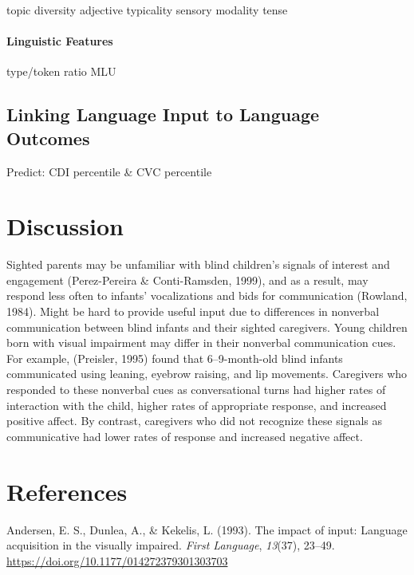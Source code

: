 \documentclass[english,man]{apa6}
\begin{document}
topic diversity
adjective typicality
sensory modality
tense

\hypertarget{linguistic-features}{%
\paragraph{Linguistic Features}\label{linguistic-features}}

type/token ratio
MLU

\hypertarget{linking-language-input-to-language-outcomes}{%
\subsection{Linking Language Input to Language Outcomes}\label{linking-language-input-to-language-outcomes}}

Predict: CDI percentile \& CVC percentile

\hypertarget{discussion}{%
\section{Discussion}\label{discussion}}

Sighted parents may be unfamiliar with blind children's signals of interest and engagement (Perez-Pereira \& Conti-Ramsden, 1999), and as a result, may respond less often to infants' vocalizations and bids for communication (Rowland, 1984). Might be hard to provide useful input due to differences in nonverbal communication between blind infants and their sighted caregivers. Young children born with visual impairment may differ in their nonverbal communication cues. For example, (Preisler, 1995) found that 6--9-month-old blind infants communicated using leaning, eyebrow raising, and lip movements. Caregivers who responded to these nonverbal cues as conversational turns had higher rates of interaction with the child, higher rates of appropriate response, and increased positive affect. By contrast, caregivers who did not recognize these signals as communicative had lower rates of response and increased negative affect.

\pagebreak

\hypertarget{references}{%
\section*{References}\label{references}}

\hypertarget{refs}{}
\leavevmode\hypertarget{ref-andersen1993}{}%
Andersen, E. S., Dunlea, A., \& Kekelis, L. (1993). The impact of input: Language acquisition in the visually impaired. \emph{First Language}, \emph{13}(37), 23--49. \url{https://doi.org/10.1177/014272379301303703}
\end{document}

